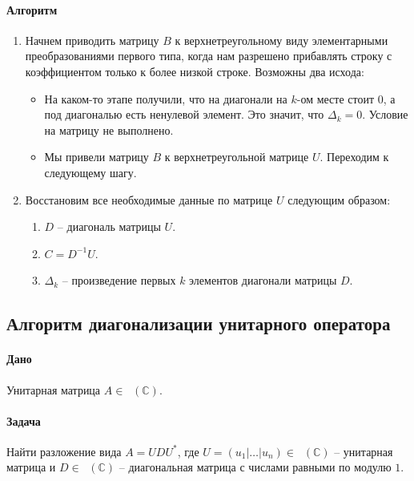 \documentclass{article}
\newcommand{\Matrix}[2]{\mathop{\mathrm{M}_{#2}}(#1)}
\begin{document}
\paragraph{Алгоритм}
\begin{enumerate}
\item Начнем приводить матрицу $B$ к верхнетреугольному виду элементарными преобразованиями первого типа, когда нам разрешено прибавлять строку с коэффициентом только к более низкой строке. Возможны два исхода:
\begin{itemize}
\item На каком-то этапе получили, что на диагонали на $k$-ом месте стоит $0$, а под диагональю есть ненулевой элемент. Это значит, что $\Delta_k = 0$. Условие на матрицу не выполнено.

\item Мы привели матрицу $B$ к верхнетреугольной матрице $U$. Переходим к следующему шагу.
\end{itemize}

\item Восстановим все необходимые данные по матрице $U$ следующим образом:
\begin{enumerate}
\item $D$ -- диагональ матрицы $U$.

\item $C =  D^{-1}U$.

\item $\Delta_k$ -- произведение первых $k$ элементов диагонали матрицы $D$.
\end{enumerate}

\end{enumerate}


\subsection{Алгоритм диагонализации унитарного оператора}

\paragraph{Дано} Унитарная матрица $A\in \Matrix{\mathbb C}{n}$.

\paragraph{Задача} Найти разложение вида $A = U D U^*$, где $U = (u_1|\ldots|u_n)\in \Matrix{\mathbb C}{n}$ -- унитарная матрица и $D\in \Matrix{\mathbb C}{n}$ -- диагональная матрица с числами равными по модулю $1$.
\end{document}
